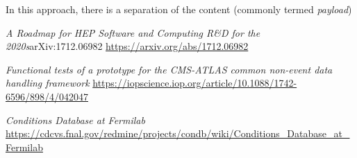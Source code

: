 \documentclass[pdftex,12pt,letter]{article}
\begin{document}
In this approach, there is a separation of the content (commonly termed \textit{payload})






\clearpage
\begin{thebibliography}{1}

{\textit{A Roadmap for HEP Software and Computing R\&D for the 2020s}arXiv:1712.06982} \url{https://arxiv.org/abs/1712.06982}

{\textit{Functional tests of a prototype for the CMS-ATLAS common non-event data handling framework}} \url{https://iopscience.iop.org/article/10.1088/1742-6596/898/4/042047}

{\textit{Conditions Database at Fermilab}  \url{https://cdcvs.fnal.gov/redmine/projects/condb/wiki/Conditions_Database_at_Fermilab}}

\end{thebibliography}
\end{document}
